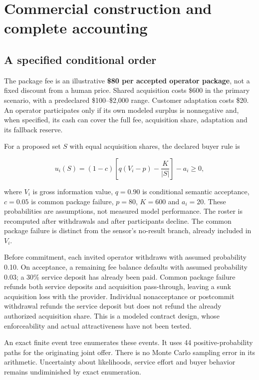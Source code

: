 \documentclass[11pt,letterpaper]{article}
\begin{document}
\hypertarget{commercial-construction-and-complete-accounting}{%
\section{Commercial construction and complete
accounting}\label{commercial-construction-and-complete-accounting}}

\hypertarget{a-specified-conditional-order}{%
\subsection{A specified conditional
order}\label{a-specified-conditional-order}}

The package fee is an illustrative \textbf{\$80 per accepted operator
package}, not a fixed discount from a human price. Shared acquisition
costs \$600 in the primary scenario, with a predeclared \$100--\$2,000
range. Customer adaptation costs \$20. An operator participates only if
its own modeled surplus is nonnegative and, when specified, its cash can
cover the full fee, acquisition share, adaptation and its fallback
reserve.

For a proposed set \(S\) with equal acquisition shares, the declared
buyer rule is

\[
u_i(S)=(1-c)\left[q(V_i-p)-\frac{K}{|S|}\right]-a_i\geq0,
\]

where \(V_i\) is gross information value, \(q=0.90\) is conditional
semantic acceptance, \(c=0.05\) is common package failure, \(p=80\),
\(K=600\) and \(a_i=20\). These probabilities are assumptions, not
measured model performance. The roster is recomputed after withdrawals
and after participants decline. The common package failure is distinct
from the sensor's no-result branch, already included in \(V_i\).

Before commitment, each invited operator withdraws with assumed
probability 0.10. On acceptance, a remaining fee balance defaults with
assumed probability 0.03; a 30\% service deposit has already been paid.
Common package failure refunds both service deposits and acquisition
pass-through, leaving a sunk acquisition loss with the provider.
Individual nonacceptance or postcommit withdrawal refunds the service
deposit but does not refund the already authorized acquisition share.
This is a modeled contract design, whose enforceability and actual
attractiveness have not been tested.

An exact finite event tree enumerates these events. It uses 44
positive-probability paths for the originating joint offer. There is no
Monte Carlo sampling error in its arithmetic. Uncertainty about
likelihoods, service effort and buyer behavior remains undiminished by
exact enumeration.
\end{document}
